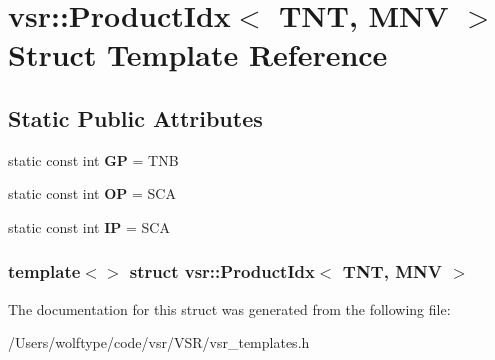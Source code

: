 \hypertarget{structvsr_1_1_product_idx_3_01_t_n_t_00_01_m_n_v_01_4}{\section{vsr\-:\-:Product\-Idx$<$ T\-N\-T, M\-N\-V $>$ Struct Template Reference}
\label{structvsr_1_1_product_idx_3_01_t_n_t_00_01_m_n_v_01_4}
}
\subsection*{Static Public Attributes}
\begin{DoxyCompactItemize}
\item 
\hypertarget{structvsr_1_1_product_idx_3_01_t_n_t_00_01_m_n_v_01_4_a8e3917d6412d5b61ab65f7fea6ef96fc}{static const int {\bfseries G\-P} = T\-N\-B}\label{structvsr_1_1_product_idx_3_01_t_n_t_00_01_m_n_v_01_4_a8e3917d6412d5b61ab65f7fea6ef96fc}

\item 
\hypertarget{structvsr_1_1_product_idx_3_01_t_n_t_00_01_m_n_v_01_4_a3ac00b372bbdf7879cf65822f91dc137}{static const int {\bfseries O\-P} = S\-C\-A}\label{structvsr_1_1_product_idx_3_01_t_n_t_00_01_m_n_v_01_4_a3ac00b372bbdf7879cf65822f91dc137}

\item 
\hypertarget{structvsr_1_1_product_idx_3_01_t_n_t_00_01_m_n_v_01_4_ab6cc51251b4069f5f773431d99f4fb89}{static const int {\bfseries I\-P} = S\-C\-A}\label{structvsr_1_1_product_idx_3_01_t_n_t_00_01_m_n_v_01_4_ab6cc51251b4069f5f773431d99f4fb89}

\end{DoxyCompactItemize}
\subsubsection*{template$<$$>$ struct vsr\-::\-Product\-Idx$<$ T\-N\-T, M\-N\-V $>$}



The documentation for this struct was generated from the following file\-:\begin{DoxyCompactItemize}
\item 
/\-Users/wolftype/code/vsr/\-V\-S\-R/vsr\-\_\-templates.\-h\end{DoxyCompactItemize}
